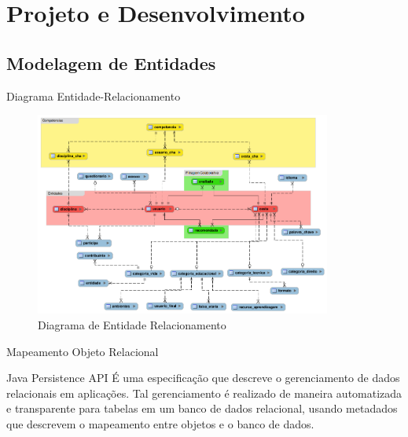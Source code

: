 \documentclass[xcolor=dvipsnames]{beamer}
\begin{document}
\section{Projeto e Desenvolvimento}
	\subsection{Modelagem de Entidades}
		\begin{frame}{Diagrama Entidade-Relacionamento}

\begin{figure}[!htb]
	\centering
	\includegraphics[keepaspectratio=true,height=6.7cm]{recomendador-ER.png}
	\caption{Diagrama de Entidade Relacionamento}
	\label{rec-ER}
\end{figure}

		\end{frame}

\begin{frame}{Mapeamento Objeto Relacional}
	
	\begin{block}{Java Persistence API}
É uma especificação que descreve o gerenciamento de dados relacionais em aplicações. Tal gerenciamento é realizado de maneira automatizada e transparente para tabelas em um banco de dados relacional, usando metadados que descrevem o mapeamento entre objetos e o banco de dados.	
	\end{block}		

\end{frame}	
\end{document}
